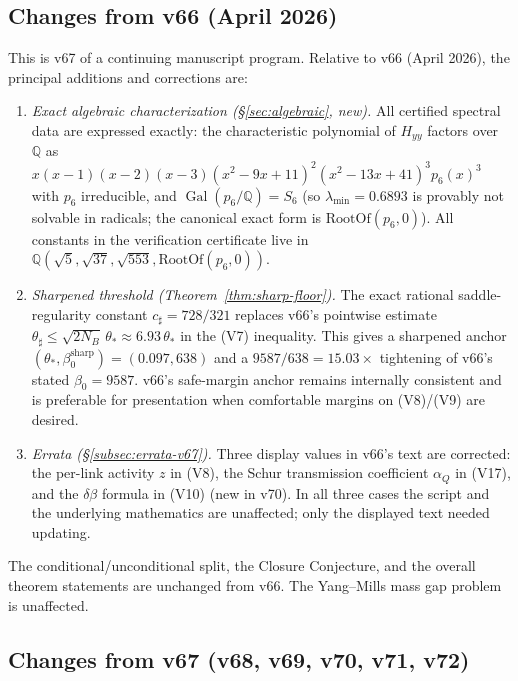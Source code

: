 \documentclass[11pt]{article}
\theoremstyle{definition}
\newcommand{\Q}{\mathbb{Q}}
\newcommand{\Gal}{\operatorname{Gal}}
\begin{document}
\subsection{Changes from v66 (April 2026)}\label{subsec:v67-changelog}

This is v67 of a continuing manuscript program.  Relative to v66
(April 2026), the principal additions and corrections are:

\begin{enumerate}[label=\textbf{(\arabic*)},leftmargin=2.5em,nosep,itemsep=0.4em]
\item \emph{Exact algebraic characterization
(\S\ref{sec:algebraic}, new).}  All certified spectral data are
expressed exactly: the characteristic polynomial of $H_{yy}$ factors
over $\Q$ as
$x(x-1)(x-2)(x-3)(x^2-9x+11)^2(x^2-13x+41)^3 p_6(x)^3$ with $p_6$
irreducible, and $\Gal(p_6/\Q)=S_6$ (so $\lambda_{\min}=0.6893$ is
provably not solvable in radicals; the canonical exact form is
$\mathrm{RootOf}(p_6,0)$).  All constants in the verification
certificate live in $\Q(\sqrt 5,\sqrt{37},\sqrt{553},\mathrm{RootOf}(p_6,0))$.

\item \emph{Sharpened threshold (Theorem~\ref{thm:sharp-floor}).}
The exact rational saddle-regularity constant $c_\sharp=728/321$
replaces v66's pointwise estimate $\theta_\sharp\le\sqrt{2N_B}\,\theta_*
\approx 6.93\,\theta_*$ in the (V7) inequality.  This gives a
sharpened anchor $(\theta_*,\beta_0^{\mathrm{sharp}})=(0.097,638)$
and a $9587/638=15.03\times$ tightening of v66's stated $\beta_0=9587$.
v66's safe-margin anchor remains internally consistent and is
preferable for presentation when comfortable margins on (V8)/(V9)
are desired.

\item \emph{Errata (\S\ref{subsec:errata-v67}).}  Three display
values in v66's text are corrected: the per-link activity $z$ in (V8),
the Schur transmission coefficient $\alpha_Q$ in (V17), and the
$\delta\beta$ formula in (V10) \textup{(}new in v70\textup{)}.  In all
three cases the script and the underlying mathematics are unaffected;
only the displayed text needed updating.
\end{enumerate}

The conditional/unconditional split, the Closure Conjecture, and the
overall theorem statements are unchanged from v66.  The Yang--Mills
mass gap problem is unaffected.

\subsection{Changes from v67 (v68, v69, v70, v71, v72)}\label{subsec:v68-v69-changelog}
\end{document}
